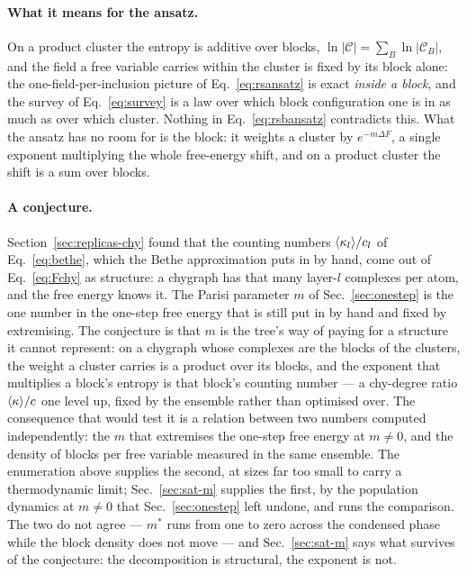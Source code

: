 \paragraph{What it means for the ansatz.} On a product cluster the entropy is
additive over blocks, $\ln|\mathcal{C}|=\sum_{B}\ln|\mathcal{C}_{B}|$, and
the field a free variable carries within the cluster is fixed by its block
alone: the one-field-per-inclusion picture of Eq.~\eqref{eq:rsansatz} is
exact \emph{inside a block}, and the survey of Eq.~\eqref{eq:survey} is a
law over which block configuration one is in as much as over which cluster.
Nothing in Eq.~\eqref{eq:rsbansatz} contradicts this. What the ansatz has no
room for is the block: it weights a cluster by $e^{-m\Delta F}$, a single
exponent multiplying the whole free-energy shift, and on a product cluster
the shift is a sum over blocks.

\paragraph{A conjecture.} Section~\ref{sec:replicas-chy} found that the
counting numbers $\langle \kappa_{l} \rangle/c_{l}$ of Eq.~\eqref{eq:bethe}, which the
Bethe approximation puts in by hand, come out of Eq.~\eqref{eq:Fchy} as
structure: a chygraph has that many layer-$l$ complexes per atom, and the
free energy knows it. The Parisi parameter $m$ of Sec.~\ref{sec:onestep} is
the one number in the one-step free energy that is still put in by hand and
fixed by extremising. The conjecture is that $m$ is the tree's way of paying
for a structure it cannot represent: on a chygraph whose complexes are the
blocks of the clusters, the weight a cluster carries is a product over its
blocks, and the exponent that multiplies a block's entropy is that block's
counting number --- a chy-degree ratio $\langle \kappa \rangle/c$ one level up, fixed
by the ensemble rather than optimised over. The consequence that would test
it is a relation between two numbers computed independently: the $m$ that
extremises the one-step free energy at $m\ne0$, and the density of blocks
per free variable measured in the same ensemble. The enumeration above
supplies the second, at sizes far too small to carry a thermodynamic limit;
Sec.~\ref{sec:sat-m} supplies the first, by the population dynamics at
$m\ne0$ that Sec.~\ref{sec:onestep} left undone, and runs the comparison.
The two do not agree --- $m^{*}$ runs from one to zero across the condensed
phase while the block density does not move --- and Sec.~\ref{sec:sat-m}
says what survives of the conjecture: the decomposition is structural, the
exponent is not.

